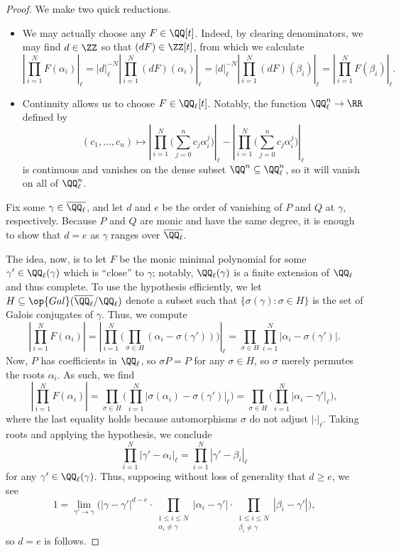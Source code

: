 \documentclass{amsart}
\begin{document}
\begin{proof}
	We make two quick reductions.
	\begin{itemize}
		\item We may actually choose any $F\in\QQ[t]$. Indeed, by clearing denominators, we may find $d\in\ZZ$ so that $(dF)\in\ZZ[t]$, from which we calculate
		\[\left|\prod_{i=1}^NF(\alpha_i)\right|_\ell=|d|_\ell^{-N}\left|\prod_{i=1}^N(dF)(\alpha_i)\right|_\ell=|d|_\ell^{-N}\left|\prod_{i=1}^N(dF)(\beta_i)\right|_\ell=\left|\prod_{i=1}^NF(\beta_i)\right|_\ell.\]
		\item Continuity allows us to choose $F\in\QQ_\ell[t]$. Notably, the function $\QQ_\ell^n\to\RR$ defined by
		\[(c_1,\ldots,c_n)\mapsto\left|\prod_{i=1}^N\Bigg(\sum_{j=0}^nc_j\alpha_i^j\Bigg)\right|_\ell-\left|\prod_{i=1}^N\Bigg(\sum_{j=0}^nc_j\alpha_i^j\Bigg)\right|_\ell\]
		is continuous and vanishes on the dense subset $\QQ^n\subseteq\QQ_\ell^n$, so it will vanish on all of $\QQ_\ell^n$.
	\end{itemize}
	Fix some $\gamma\in\overline{\QQ_\ell}$, and let $d$ and $e$ be the order of vanishing of $P$ and $Q$ at $\gamma$, respectively. Because $P$ and $Q$ are monic and have the same degree, it is enough to show that $d=e$ as $\gamma$ ranges over $\overline{\QQ_\ell}$.

	The idea, now, is to let $F$ be the monic minimal polynomial for some $\gamma'\in\QQ_\ell(\gamma)$ which is ``close'' to $\gamma$; notably, $\QQ_\ell(\gamma)$ is a finite extension of $\QQ_\ell$ and thus complete. To use the hypothesis efficiently, we let $H\subseteq\op{Gal}(\overline{\QQ_\ell}/\QQ_\ell)$ denote a subset such that $\{\sigma(\gamma):\sigma\in H\}$ is the set of Galois conjugates of $\gamma$. Thus, we compute
	\[\left|\prod_{i=1}^NF(\alpha_i)\right|=\left|\prod_{i=1}^N\Bigg(\prod_{\sigma\in H}(\alpha_i-\sigma(\gamma'))\Bigg)\right|_\ell=\prod_{\sigma\in H}\prod_{i=1}^N\left|\alpha_i-\sigma(\gamma')\right|.\]
	Now, $P$ has coefficients in $\QQ_\ell$, so $\sigma P=P$ for any $\sigma\in H$, so $\sigma$ merely permutes the roots $\alpha_i$. As such, we find
	\[\left|\prod_{i=1}^NF(\alpha_i)\right|=\prod_{\sigma\in H}\Bigg(\prod_{i=1}^N\left|\sigma(\alpha_i)-\sigma(\gamma')\right|_\ell\Bigg)=\prod_{\sigma\in H}\Bigg(\prod_{i=1}^N\left|\alpha_i-\gamma'\right|_\ell\Bigg),\]
	where the last equality holds because automorphisms $\sigma$ do not adjust $\left|\cdot\right|_\ell$. Taking roots and applying the hypothesis, we conclude
	\[\prod_{i=1}^N\left|\gamma'-\alpha_i\right|_\ell=\prod_{i=1}^N\left|\gamma'-\beta_i\right|_\ell\]
	for any $\gamma'\in\QQ_\ell(\gamma)$. Thus, supposing without loss of generality that $d\ge e$, we see
	\[1=\lim_{\gamma'\to\gamma}\Bigg(\left|\gamma-\gamma'\right|^{d-e}\cdot\prod_{\substack{1\le i\le N\\\alpha_i\ne\gamma}}\left|\alpha_i-\gamma'\right|\cdot\prod_{\substack{1\le i\le N\\\beta_i\ne\gamma}}\left|\beta_i-\gamma'\right|\Bigg),\]
	so $d=e$ is follows.
\end{proof}
\end{document}
